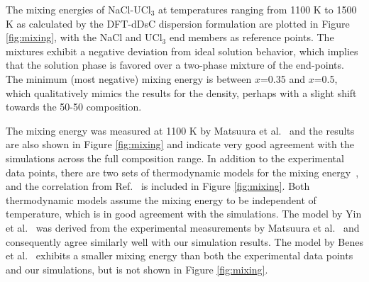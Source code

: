 \documentclass[preprint,3p,10pt,onecolumn,number,sort&compress]{elsarticle}
\begin{document}
{The mixing energies of NaCl-UCl$_3$ at temperatures ranging from 1100 K to 1500 K as calculated by the DFT-dDsC dispersion formulation are plotted in Figure \ref{fig:mixing}, with the NaCl and UCl$_3$ end members as reference points. The mixtures exhibit a negative deviation from ideal solution behavior, which implies that the solution phase is favored over a two-phase mixture of the end-points. 
 The minimum (most negative) mixing energy is between $x$=0.35 and $x$=0.5, which qualitatively mimics the results for the density, perhaps with a slight shift towards the 50-50 composition. %
 
 The mixing energy was measured at 1100 K by Matsuura et al.~\cite{Matsuura} and the results are also shown in Figure \ref{fig:mixing} and indicate very good agreement with the simulations across the full composition range. In addition to the experimental data points, there are two sets of thermodynamic models for the mixing energy~\cite{BENES2008,YIN2020}, and the correlation from Ref.~\cite{YIN2020} is included in Figure \ref{fig:mixing}. Both thermodynamic models assume the mixing energy to be independent of temperature, which is in good agreement with the simulations. The model by Yin et al.~\cite{YIN2020} was derived from the experimental measurements by Matsuura et al.~\cite{Matsuura} and consequently agree similarly well with our simulation results. The model by Benes et al.~\cite{BENES2008} exhibits a smaller mixing energy than both the experimental data points and our simulations, but is not shown in Figure \ref{fig:mixing}. 


}
\end{document}
